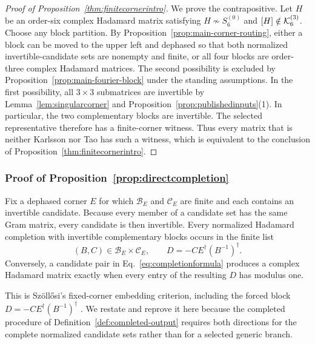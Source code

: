 \begin{proof}[Proof of Proposition~\ref{thm:finitecornerintro}]
{We prove the contrapositive. Let $H$ be an order-six complex Hadamard matrix satisfying $H\not\sim S_6^{(0)}$ and $[H]\notin\mathcal K_6^{(3)}$. Choose any block partition. By Proposition~\ref{prop:main-corner-routing}, either a block can be moved to the upper left and dephased so that both normalized invertible-candidate sets are nonempty and finite, or all four blocks are order-three complex Hadamard matrices. The second possibility is excluded by Proposition~\ref{prop:main-fourier-block} under the standing assumptions. In the first possibility, all $3\times3$ submatrices are invertible by Lemma~\ref{lem:singularcorner} and Proposition~\ref{prop:publishedinputs}(1). In particular, the two complementary blocks are invertible. The selected representative therefore has a finite-corner witness. Thus every matrix that is neither Karlsson nor Tao has such a witness, which is equivalent to the conclusion of Proposition~\ref{thm:finitecornerintro}.}
\end{proof}

\subsubsection{{Proof of Proposition~\ref{prop:directcompletion}}}

\begin{proposition}
\label{prop:directcompletion}
Fix a dephased corner $E$ for which $\mathcal B_E$ and $\mathcal C_E$ are finite and each contains an invertible candidate.  Because every member of a candidate set has the same Gram matrix, every candidate is then invertible. Every normalized Hadamard completion with invertible complementary blocks occurs in the finite list
\begin{equation}
(B,C)\in\mathcal B_E\times\mathcal C_E,
\qquad
D=-CE^{\dagger}(B^{-1})^{\dagger}.
\label{eq:completionformula}
\end{equation}
Conversely, a candidate pair in Eq.~\eqref{eq:completionformula} produces a complex Hadamard matrix exactly when every entry of the resulting $D$ has modulus one.
\end{proposition}

This is Sz\"oll\H{o}si's fixed-corner embedding criterion, including the forced block $D=-CE^{\dagger}(B^{-1})^{\dagger}$ \MainCiteSzollosi. We restate and reprove it here because the completed procedure of Definition~\ref{def:completed-output} requires both directions for the complete normalized candidate sets rather than for a selected generic branch.

